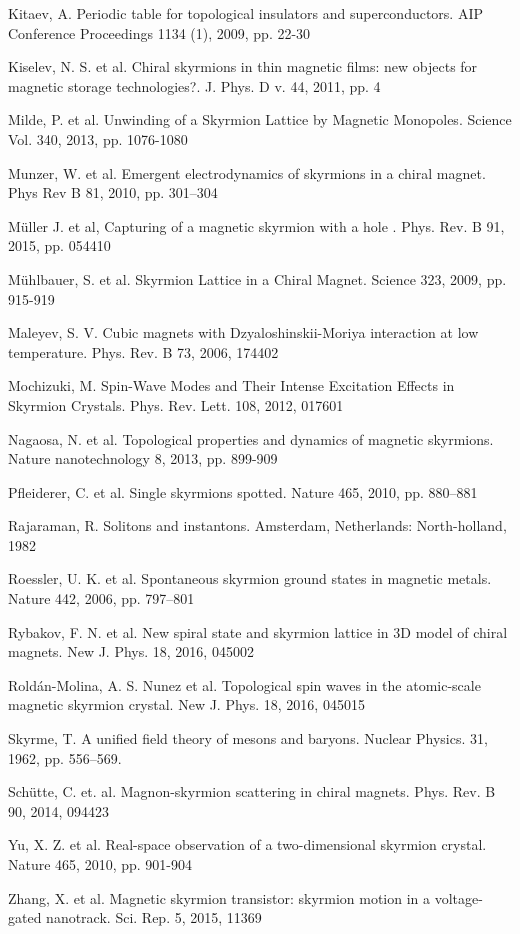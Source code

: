 \documentclass[a4paper,article,14pt]{extarticle}
\begin{document}
\begin{thebibliography}{1}
 Kitaev, A. \flqq Periodic table for topological insulators and superconductors\frqq. AIP Conference Proceedings 1134 (1), 2009, pp. 22-30

 Kiselev, N. S. et al. \flqq Chiral skyrmions in thin magnetic films: new objects for magnetic storage technologies?\frqq. J. Phys. D v. 44, 2011, pp. 4

 Milde, P. et al. \flqq Unwinding of a Skyrmion Lattice by Magnetic Monopoles\frqq. Science Vol. 340, 2013, pp. 1076-1080

 Munzer, W. et al. \flqq Emergent electrodynamics of skyrmions in a chiral magnet\frqq. Phys Rev B 81, 2010, pp. 301–304

 Müller J. et al, \flqq Capturing of a magnetic skyrmion with a hole \frqq. Phys. Rev. B 91, 2015, pp. 054410

 Mühlbauer, S. et al. \flqq Skyrmion Lattice in a Chiral Magnet\frqq. Science 323, 2009, pp. 915-919

 Maleyev, S. V. \flqq Cubic magnets with Dzyaloshinskii-Moriya interaction at low temperature\frqq. Phys. Rev. B  73, 2006, 174402

 Mochizuki, M. \flqq Spin-Wave Modes and Their Intense Excitation Effects in Skyrmion Crystals\frqq.  Phys. Rev. Lett. 108, 2012, 017601

 Nagaosa, N. et al. \flqq Topological properties and dynamics of magnetic skyrmions\frqq. Nature nanotechnology 8, 2013, pp. 899-909

 Pfleiderer, C. et al. \flqq Single skyrmions spotted\frqq. Nature 465, 2010, pp. 880–881

 Rajaraman, R. \flqq Solitons and instantons\frqq. Amsterdam, Netherlands: North-holland, 1982

 Roessler, U. K. et al. \flqq Spontaneous skyrmion ground
states in magnetic metals\frqq. Nature 442, 2006, pp. 797–801

 Rybakov, F. N. et al. \flqq New spiral state and skyrmion lattice in 3D model of chiral magnets\frqq. New J. Phys. 18, 2016, 045002

 Roldán-Molina, A. S. Nunez et al. \flqq Topological spin waves in the atomic-scale magnetic skyrmion crystal\frqq. New J. Phys. 18, 2016, 045015

 Skyrme, T. \flqq A unified field theory of mesons and baryons\frqq. Nuclear Physics. 31, 1962, pp. 556–569.

 Sch{\"u}tte, C. et. al. \flqq Magnon-skyrmion scattering in chiral magnets\frqq. Phys. Rev. B 90, 2014, 094423 

 Yu, X. Z. et al. \flqq Real-space observation of a two-dimensional skyrmion crystal\frqq. Nature 465, 2010, pp. 901-904

 Zhang, X. et al. \flqq Magnetic skyrmion transistor: skyrmion motion in a voltage-gated nanotrack\frqq. Sci. Rep. 5, 2015, 11369

\end{thebibliography}
\end{document}
